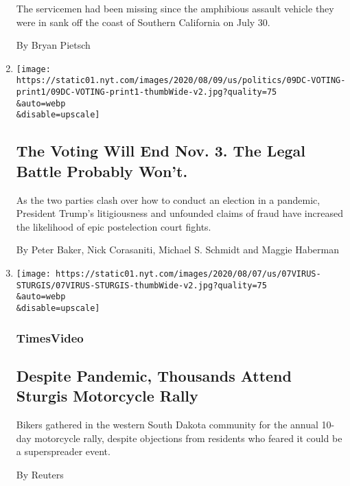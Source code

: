 \begin{enumerate}
  The servicemen had been missing since the amphibious assault vehicle
  they were in sank off the coast of Southern California on July 30.

  By Bryan Pietsch
\item
  \href{/2020/08/08/us/politics/voting-nov-3-election.html}{}

  \texttt{[image: https://static01.nyt.com/images/2020/08/09/us/politics/09DC-VOTING-print1/09DC-VOTING-print1-thumbWide-v2.jpg?quality=75\\\&auto=webp\\\&disable=upscale]}

  \hypertarget{the-voting-will-end-nov-3-the-legal-battle-probably-wont}{%
  \subsection{The Voting Will End Nov. 3. The Legal Battle Probably
  Won't.}\label{the-voting-will-end-nov-3-the-legal-battle-probably-wont}}

  As the two parties clash over how to conduct an election in a
  pandemic, President Trump's litigiousness and unfounded claims of
  fraud have increased the likelihood of epic postelection court fights.

  By Peter Baker, Nick Corasaniti, Michael S. Schmidt and Maggie
  Haberman
\item
  \href{/video/us/100000007279713/sturgis-motorcycle-rally-coronavirus.html}{}

  \texttt{[image: https://static01.nyt.com/images/2020/08/07/us/07VIRUS-STURGIS/07VIRUS-STURGIS-thumbWide-v2.jpg?quality=75\\\&auto=webp\\\&disable=upscale]}

  \hypertarget{timesvideo-1}{%
  \subsubsection{TimesVideo}\label{timesvideo-1}}

  \hypertarget{despite-pandemic-thousands-attend-sturgis-motorcycle-rally}{%
  \subsection{Despite Pandemic, Thousands Attend Sturgis Motorcycle
  Rally}\label{despite-pandemic-thousands-attend-sturgis-motorcycle-rally}}

  Bikers gathered in the western South Dakota community for the annual
  10-day motorcycle rally, despite objections from residents who feared
  it could be a superspreader event.

  By Reuters
\end{enumerate}

